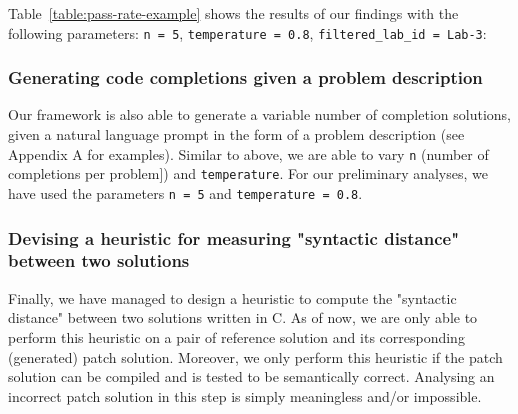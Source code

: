 Table~\ref{table:pass-rate-example} shows the results of our findings with the following
parameters: \texttt{n = 5}, \texttt{temperature = 0.8}, \texttt{filtered\_lab\_id = Lab-3}:

\begin{table}[h]
\centering

\label{table:pass-rate-example}
\end{table}

\subsubsection{Generating code completions given a problem description}

Our framework is also able to generate a variable number of completion solutions, given a natural
language prompt in the form of a problem description (see Appendix A for examples).
Similar to above, we are able to vary \texttt{n} (number of completions per problem]) and
\texttt{temperature}.
For our preliminary analyses, we have used the parameters \texttt{n = 5} and
\texttt{temperature = 0.8}.

\subsubsection{Devising a heuristic for measuring "syntactic distance" between two solutions}

Finally, we have managed to design a heuristic to compute the "syntactic distance" between two solutions
written in C.
As of now, we are only able to perform this heuristic on a pair of reference solution and its corresponding
(generated) patch solution.
Moreover, we only perform this heuristic if the patch solution can be compiled and is tested to be
semantically correct.
Analysing an incorrect patch solution in this step is simply meaningless and/or impossible.

